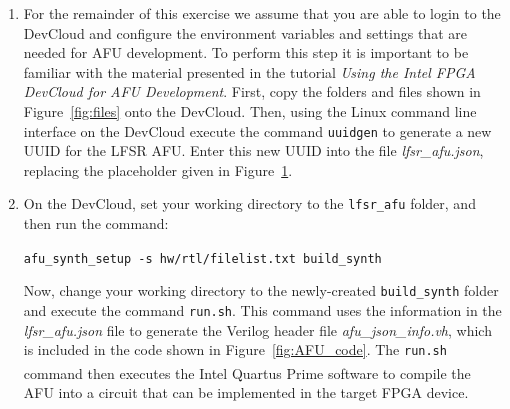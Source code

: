 \documentclass[epsfig,10pt,fullpage]{article}
\begin{document}
\begin{enumerate}
\lstset{language=Java,numbers=none,escapechar=|}
\begin{figure}[H]
\begin{center}
\begin{minipage}[h]{15 cm}
\begin{lstlisting}[name=json]
{
    "version": 1,
    "afu-image": {
        "power": 0,
        "afu-top-interface": {
            "class": "ccip_std_afu"
        },
        "accelerator-clusters": [
            {
                "name": "lfsr_afu",
                "total-contexts": 1,
                "accelerator-type-uuid": "850adcc2-6ceb-4b22-9722-d43375b61c66"
            }
        ]
    }
}
\end{lstlisting}
\end{minipage}
\vspace{-.5cm}
\caption{The JSON file.}
\label{fig:json}
\end{center}
\end{figure}

\item
For the remainder of this exercise we assume that you are able to login to the DevCloud
and configure the environment variables and settings that are needed for AFU development. 
To perform this step it is important to be familiar with the material presented in the
tutorial {\it Using the Intel FPGA DevCloud for AFU Development}. First, 
copy the folders and files shown in Figure~\ref{fig:files} onto the DevCloud.  Then, 
using the Linux command line interface on the DevCloud execute the command 
\texttt{uuidgen} to generate a new UUID for the LFSR AFU.
Enter this new UUID into the file {\it lfsr\_afu.json}, replacing the placeholder given in
Figure~\ref{fig:json}.

\item
On the DevCloud, set your working directory to the \texttt{lfsr\_afu} folder, and then 
run the command: 

\noindent
\texttt{afu\_synth\_setup -s hw/rtl/filelist.txt build\_synth}

Now, change your working directory to the newly-created \texttt{build\_synth} folder and 
execute the command \texttt{run.sh}. This command uses the information in 
the {\it lfsr\_afu.json} file to generate the Verilog header file {\it afu\_json\_info.vh}, 
which is included in the code shown in Figure~\ref{fig:AFU_code}. 
The \texttt{run.sh} command then executes the Intel 
Quartus\textsuperscript{\textregistered} Prime software to compile the AFU into a circuit
that can be implemented in the target FPGA device.


\end{enumerate}
\end{document}
